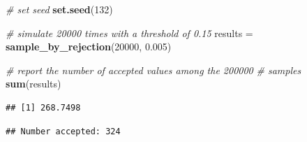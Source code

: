 \documentclass[
]{article}
\newenvironment{Shaded}{\begin{snugshade}}{\end{snugshade}}
\newcommand{\CommentTok}[1]{\textcolor[rgb]{0.56,0.35,0.01}{\textit{#1}}}
\newcommand{\DecValTok}[1]{\textcolor[rgb]{0.00,0.00,0.81}{#1}}
\newcommand{\FloatTok}[1]{\textcolor[rgb]{0.00,0.00,0.81}{#1}}
\newcommand{\FunctionTok}[1]{\textcolor[rgb]{0.13,0.29,0.53}{\textbf{#1}}}
\newcommand{\NormalTok}[1]{#1}
\newcommand{\OtherTok}[1]{\textcolor[rgb]{0.56,0.35,0.01}{#1}}
\newcommand{\SpecialCharTok}[1]{\textcolor[rgb]{0.81,0.36,0.00}{\textbf{#1}}}
\newcommand{\StringTok}[1]{\textcolor[rgb]{0.31,0.60,0.02}{#1}}
\begin{document}
\begin{Shaded}
\begin{Highlighting}[]
\CommentTok{\# set seed}
\FunctionTok{set.seed}\NormalTok{(}\DecValTok{132}\NormalTok{)}

\CommentTok{\# simulate 20000 times with a threshold of 0.15}
\NormalTok{results }\OtherTok{=} \FunctionTok{sample\_by\_rejection}\NormalTok{(}\DecValTok{20000}\NormalTok{,}
    \FloatTok{0.005}\NormalTok{)}

\CommentTok{\# report the number of accepted values among the 200000}
\CommentTok{\# samples}
\FunctionTok{sum}\NormalTok{(results)}
\end{Highlighting}
\end{Shaded}

\begin{verbatim}
## [1] 268.7498
\end{verbatim}

\begin{Shaded}
\end{Shaded}

\begin{verbatim}
## Number accepted: 324
\end{verbatim}
\end{document}
